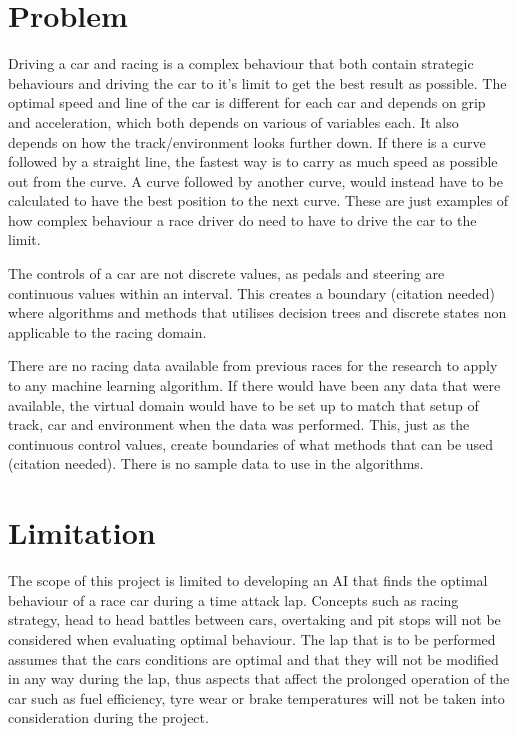 \section{Problem}
Driving a car and racing is a complex behaviour that both contain strategic behaviours and driving the car to it's limit to get the best result as possible. The optimal speed and line of the car is different for each car and depends on grip and acceleration, which both depends on various of variables each. It also depends on how the track/environment looks further down. If there is a curve followed by a straight line, the fastest way is to carry as much speed as possible out from the curve. A curve followed by another curve, would instead have to be calculated to have the best position to the next curve. These are just examples of how complex behaviour a race driver do need to have to drive the car to the limit.

The controls of a car are not discrete values, as pedals and steering are continuous values within an interval. This creates a boundary (citation needed) where algorithms and methods that utilises decision trees and discrete states non applicable to the racing domain. 

There are no racing data available from previous races for the research to apply to any machine learning algorithm. If there would have been any data that were available, the virtual domain would have to be set up to match that setup of track, car and environment when the data was performed. This, just as the continuous control values, create boundaries of what methods that can be used (citation needed). There is no sample data to use in the algorithms. 




\section{Limitation}


The scope of this project is limited to developing an AI that finds the optimal behaviour of a race car during a time attack lap. Concepts such as racing strategy, head to head battles between cars, overtaking and pit stops will not be considered when evaluating optimal behaviour. The lap that is to be performed assumes that the cars conditions are optimal and that they will not be modified in any way during the lap, thus aspects that affect the prolonged operation of the car such as fuel efficiency, tyre wear or brake temperatures will not be taken into consideration during the project.

